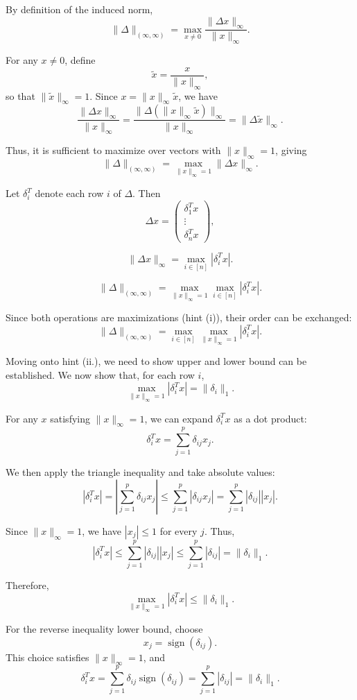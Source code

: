 \documentclass{article}
\begin{document}
By definition of the induced norm,
\[
\|\Delta\|_{(\infty,\infty)}
=
\max_{x\neq 0}
\frac{\|\Delta x\|_\infty}{\|x\|_\infty}.
\]

For any $x\neq 0$, define
\[
\tilde{x}=\frac{x}{\|x\|_\infty},
\]
so that $\|\tilde{x}\|_\infty=1$. Since
$x=\|x\|_\infty\tilde{x}$, we have
\[
\frac{\|\Delta x\|_\infty}{\|x\|_\infty}
=
\frac{\|\Delta(\|x\|_\infty\tilde{x})\|_\infty}
{\|x\|_\infty}
=
\|\Delta\tilde{x}\|_\infty.
\]

Thus, it is sufficient to maximize over vectors with
$\|x\|_\infty=1$, giving
\[
\|\Delta\|_{(\infty,\infty)}
=
\max_{\|x\|_\infty=1}\|\Delta x\|_\infty.
\]

Let $\delta_i^T$ denote each row $i$ of $\Delta$. Then
\[
\Delta x
=
\begin{pmatrix}
\delta_1^T x\\
\vdots\\
\delta_n^T x
\end{pmatrix},
\]


\[
\|\Delta x\|_\infty
=
\max_{i\in[n]}|\delta_i^T x|.
\]


\[
\|\Delta\|_{(\infty,\infty)}
=
\max_{\|x\|_\infty=1}
\max_{i\in[n]}|\delta_i^T x|.
\]

Since both operations are maximizations (hint (i)), their order can be exchanged:
\[
\|\Delta\|_{(\infty,\infty)}
=
\max_{i\in[n]}
\max_{\|x\|_\infty=1}
|\delta_i^T x|.
\]

\vspace{5mm}
Moving onto hint (ii.), we need to show upper and lower bound can be established. We now show that, for each row $i$,
\[
\max_{\|x\|_\infty=1}|\delta_i^T x|
=
\|\delta_i\|_1.
\]

For any $x$ satisfying $\|x\|_\infty=1$, we can expand
$\delta_i^T x$ as a dot product:
\[
\delta_i^T x
=
\sum_{j=1}^p \delta_{ij}x_j.
\]

We then apply the triangle inequality and take absolute values: 
\[
|\delta_i^T x|
=
\left|
\sum_{j=1}^p \delta_{ij}x_j
\right|
\leq
\sum_{j=1}^p |\delta_{ij}x_j|
=
\sum_{j=1}^p |\delta_{ij}||x_j|.
\]


Since $\|x\|_\infty=1$, we have $|x_j|\leq 1$ for every $j$.
Thus,
\[
|\delta_i^T x|
\leq
\sum_{j=1}^p |\delta_{ij}||x_j|
\leq
\sum_{j=1}^p|\delta_{ij}|
=
\|\delta_i\|_1.
\]

Therefore,
\[
\max_{\|x\|_\infty=1}|\delta_i^T x|
\leq
\|\delta_i\|_1.
\]

\vspace{5mm}
For the reverse inequality lower bound, choose
\[
x_j=\operatorname{sign}(\delta_{ij}).
\]
This choice satisfies $\|x\|_\infty=1$, and
\[
\delta_i^T x
=
\sum_{j=1}^p
\delta_{ij}\operatorname{sign}(\delta_{ij})
=
\sum_{j=1}^p|\delta_{ij}|
=
\|\delta_i\|_1.
\]
\end{document}

